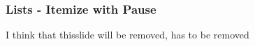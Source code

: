  
\label{pause}
\begin{frame}\frametitle{Lists - Itemize with Pause}
  \begin{itemize}
    \begin{itemize}
    I think that thisslide will be removed, has to be removed
    \end{itemize}
  \end{itemize}
\end{frame}

 
